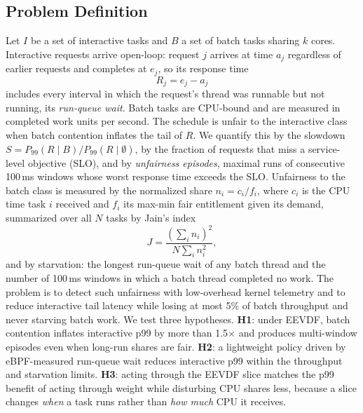\documentclass[conference]{IEEEtran}
\newcommand{\ms}{\,ms}
\begin{document}
\subsection{Problem Definition}
Let $I$ be a set of interactive tasks and $B$ a set of batch tasks sharing $k$ cores. Interactive requests arrive open-loop: request $j$ arrives at time $a_j$ regardless of earlier requests and completes at $e_j$, so its response time
\begin{equation}
R_j = e_j - a_j
\end{equation}
includes every interval in which the request's thread was runnable but not running, its \emph{run-queue wait}. Batch tasks are CPU-bound and are measured in completed work units per second. The schedule is unfair to the interactive class when batch contention inflates the tail of $R$. We quantify this by the slowdown $S = P_{99}(R \mid B) / P_{99}(R \mid \emptyset)$, by the fraction of requests that miss a service-level objective (SLO), and by \emph{unfairness episodes}, maximal runs of consecutive 100\ms{} windows whose worst response time exceeds the SLO. Unfairness to the batch class is measured by the normalized share $n_i = c_i / f_i$, where $c_i$ is the CPU time task $i$ received and $f_i$ its max-min fair entitlement given its demand, summarized over all $N$ tasks by Jain's index~\cite{jain1984fairness}
\begin{equation}
J = \frac{\left(\sum_i n_i\right)^2}{N \sum_i n_i^2},
\end{equation}
and by starvation: the longest run-queue wait of any batch thread and the number of 100\ms{} windows in which a batch thread completed no work. The problem is to detect such unfairness with low-overhead kernel telemetry and to reduce interactive tail latency while losing at most 5\% of batch throughput and never starving batch work. We test three hypotheses. \textbf{H1}: under EEVDF, batch contention inflates interactive p99 by more than 1.5$\times$ and produces multi-window episodes even when long-run shares are fair. \textbf{H2}: a lightweight policy driven by eBPF-measured run-queue wait reduces interactive p99 within the throughput and starvation limits. \textbf{H3}: acting through the EEVDF slice matches the p99 benefit of acting through weight while disturbing CPU shares less, because a slice changes \emph{when} a task runs rather than \emph{how much} CPU it receives.
\end{document}
